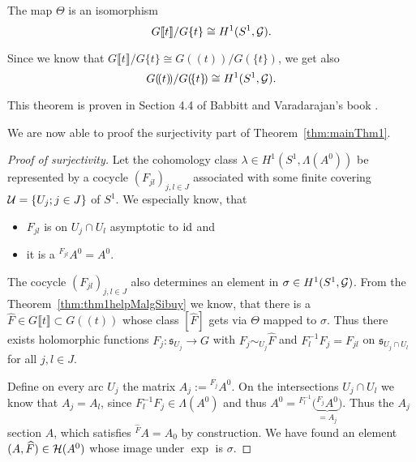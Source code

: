\begin{thm}\label{thm:thm1helpMalgSibuy}
  The map $\Theta$ is an isomorphism
  \[
    G\llbracket t\rrbracket/G\{t\}\cong H^1(S^1,\mathcal{G}).
  \]
  \begin{s-rem}
    Since we know that
    $G\llbracket t\rrbracket/G\{t\}\cong G(\!(t)\!)/G(\!\{t\}\!)$\TODO[(cf~??)],
    we get also
    \[
      G(\!(t)\!)/G(\!\{t\}\!)\cong H^1(S^1,\mathcal{G}).
    \]
  \end{s-rem}
\end{thm}
This theorem is proven in Section 4.4 of Babbitt and Varadarajan's book
\cite{babbitt1989local}.

We are now able to proof the surjectivity part of Theorem~\ref{thm:mainThm1}.
\begin{proof}[Proof of surjectivity]
  Let the cohomology class $\lambda\in H^1(S^1,\Lambda(A^0))$ be represented by
  a cocycle $(F_{jl})_{j,l\in J}$ associated with some finite covering
  $\mathcal{U}=\{U_j;j\in J\}$ of $S^1$. We especially know, that
  \begin{itemize}
    \item $F_{jl}$ is on $U_j\cap U_l$ asymptotic to $\operatorname{id}$ and
    \item it is a  ${}^{F_{jl}}A^0=A^0$.
  \end{itemize}
  The cocycle $(F_{jl})_{j,l\in J}$ also determines an element in
  $\sigma\in H^1(S^1,\mathcal{G})$.
  From the Theorem~\ref{thm:thm1helpMalgSibuy} we know, that there is a $\hat
  F\in G\llbracket t\rrbracket\subset G(\!(t)\!)$ whose class $[\hat F]$ gets
  via $\Theta$ mapped to $\sigma$.
  Thus there exists holomorphic functions $F_j:\mathfrak{s}_{U_j}\to G$ with
  $F_j\sim_{U_j}\hat F$ and $F_l^{-1}F_j=F_{jl}$ on
  $\mathfrak{s}_{U_j\cap U_l}$ for all $j,l\in J$.

  Define on every arc $U_j$ the matrix $A_j:={}^{F_j}A^0$.
  On the intersections $U_j\cap U_l$ we know that $A_j=A_l$, since
  $F_l^{-1}F_j\in\Lambda(A^0)$ and thus
  $A^0={}^{F_l^{-1}}\Big(\underset{=A_j}{\underbrace{{}^{F_j}A^0}}\Big)$.
  Thus the $A_j$  section $A$, which satisfies
  ${}^{\hat F}A=A_0$ by construction.
  We have found an element $(A,\widehat F)\in\mathcal{H}(A^0)$ whose image under $\exp$ is
  $\sigma$.
\end{proof}

